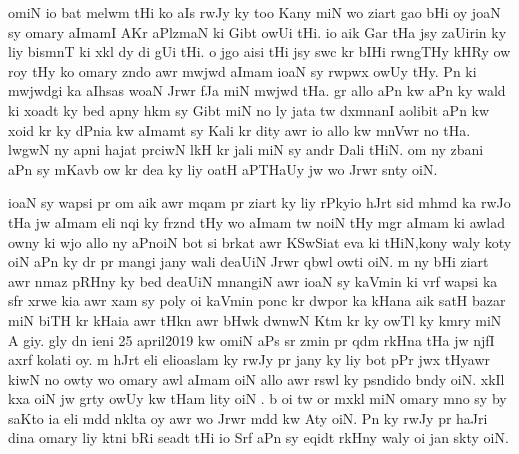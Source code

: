 \documentclass[a4paper]{article}
\begin{document}
omiN io bat melwm tHi ko aIs rwJy ky too Kany miN wo ziart gao bHi oy joaN sy omary aImamI AKr aPlzmaN ki Gibt owUi tHi.
io aik Gar tHa jsy zaUirin ky liy bismnT ki xkl dy di gUi tHi.
o jgo aisi tHi jsy swc kr bIHi rwngTHy kHRy ow roy tHy ko omary  zndo awr mwjwd aImam ioaN sy rwpwx owUy tHy.
Pn ki mwjwdgi ka aIhsas woaN Jrwr fJa miN mwjwd tHa.
gr allo  aPn kw aPn ky wald ki xoadt ky bed apny hkm sy Gibt miN no ly jata tw dxmnanI aolibit aPn kw xoid kr ky dPnia kw  aImamt sy Kali kr dity awr io allo kw mnVwr no tHa.
lwgwN ny apni hajat prciwN lkH kr jali miN sy andr Dali tHiN.
om ny zbani aPn sy mKavb ow kr dea ky liy oatH aPTHaUy jw wo Jrwr snty oiN.

ioaN sy wapsi pr om aik awr mqam pr ziart ky liy rPkyio hJrt sid mhmd ka rwJo tHa jw aImam eli nqi ky frznd tHy wo     aImam tw noiN tHy mgr aImam ki awlad owny ki wjo allo ny aPnoiN bot si brkat awr KSwSiat eva ki tHiN,kony waly koty oiN aPn ky dr pr mangi jany wali deaUiN Jrwr qbwl owti oiN.
m ny  bHi ziart awr nmaz pRHny ky bed deaUiN mnangiN awr ioaN sy kaVmin ki vrf wapsi ka sfr xrwe kia awr xam sy poly oi kaVmin ponc kr dwpor ka kHana aik satH bazar miN biTH kr kHaia awr tHkn awr bHwk dwnwN Ktm kr ky owTl ky kmry miN A giy.
gly dn ieni 25 april2019 kw omiN aPs sr zmin pr qdm rkHna tHa jw njfI axrf kolati oy.
m hJrt eli elioaslam ky rwJy pr jany ky liy bot pPr jwx tHyawr kiwN no owty wo omary awl aImam oiN allo awr rswl ky psndido bndy oiN.
xkIl kxa oiN jw grty owUy kw tHam lity oiN .
b oi tw  or mxkl miN omary mno sy by saKto ia eli mdd nklta oy awr wo Jrwr mdd kw Aty oiN.
Pn ky rwJy pr haJri dina omary liy ktni bRi seadt tHi io Srf aPn sy eqidt rkHny waly oi jan skty oiN.
\end{document}

